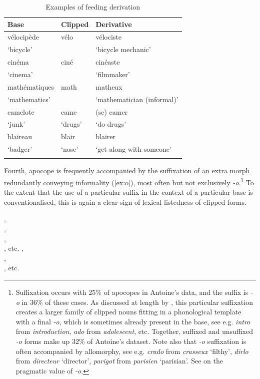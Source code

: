 \documentclass[output=paper,colorlinks,citecolor=brown]{langscibook}
\begin{document}
\begin{table}
	\centering
	\begin{tabular}{lll}
		\lsptoprule
		Base &  Clipped &  Derivative\\
		\midrule
		vélocipède & vélo & vélociste\\
		‘bicycle’ & & ‘bicycle mechanic’\\
		cinéma & ciné & cinéaste\\
		‘cinema’ & & ‘filmmaker’\\
		mathématiques & math & matheux\\
		‘mathematics’ & & ‘mathematician (informal)’\\
		camelote & came & (se) camer\\
		‘junk’ & ‘drugs’& ‘do drugs’\\
		blaireau & blair & blairer\\
		‘badger’ & ‘nose’ & ‘get along with someone’\\
		\lspbottomrule
	\end{tabular}
	\caption{Examples of  feeding derivation\label{tab:derivation}}
\end{table}

Fourth, apocope is frequently accompanied by the suffixation of an extra morph redundantly conveying informality (\ref{ex:o}), most often but not exclusively \emph{-o}.\footnote{\label{o-suff}Suffixation occurs with 25\% of apocopes in Antoine's data, and the suffix is \emph{-o} in 36\% of these cases. As discussed at length by \citet{vihman2019}, this particular suffixation creates a larger family of clipped nouns fitting in a phonological template with a final  \emph{-o}, which is sometimes already  present in the base, see e.g. \emph{intro} from \emph{introduction}, \emph{ado} from \emph{adolescent}, etc. Together, suffixed and unsuffixed \emph{-o} forms make up 32\% of Antoine's dataset. Note also that \emph{-o} suffixation is often accompanied by  allomorphy, see e.g. \emph{crado} from \emph{crasseux} ‘filthy’, \emph{dirlo} from \emph{directeur} ‘director’, \emph{parigot} from \emph{parisien} ‘parisian’. See \citet{kilanischochdressler1999} on the pragmatic value of \emph{-o}.} To the extent that the use of a particular suffix in the context of a particular base is conventionalised, this is again a clear sign of lexical listedness of clipped forms.

\begin{exe}
	\ex\label{ex:o}\begin{xlist}
		\ex {},\\ ,\\ ,\\ , etc.
		\ex {},\\ ,\\ , etc.
	\end{xlist}
\end{exe}
\end{document}
